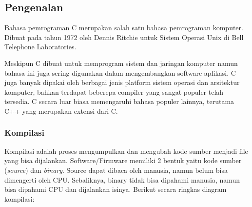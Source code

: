 \documentclass[12pt,]{article}
\begin{document}
	\newpage
	\subsection{Pengenalan}
	Bahasa pemrograman C merupakan salah satu bahasa pemrograman komputer. Dibuat pada tahun 1972 oleh Dennis Ritchie untuk Sistem Operasi Unix di Bell Telephone Laboratories.

	Meskipun C dibuat untuk memprogram sistem dan jaringan komputer namun bahasa ini juga sering digunakan dalam mengembangkan software aplikasi.
	C juga banyak dipakai oleh berbagai jenis platform sistem operasi dan arsitektur komputer, bahkan terdapat beberepa compiler yang sangat populer telah tersedia.
	C secara luar biasa memengaruhi bahasa populer lainnya, terutama C++ yang merupakan extensi dari C.

	\subsubsection{Kompilasi}
	Kompilasi adalah proses mengumpulkan dan mengubah kode sumber menjadi file yang bisa dijalankan.
	Software/Firmware memiliki 2 bentuk yaitu kode sumber (\textit{source}) dan \textit{binary}.
	Source dapat dibaca oleh manusia, namun belum bisa dimengerti oleh CPU.
	Sebaliknya, binary tidak bisa dipahami manusia, namun bisa dipahami CPU dan dijalankan isinya.
	Berikut secara ringkas diagram kompilasi:
\end{document}
